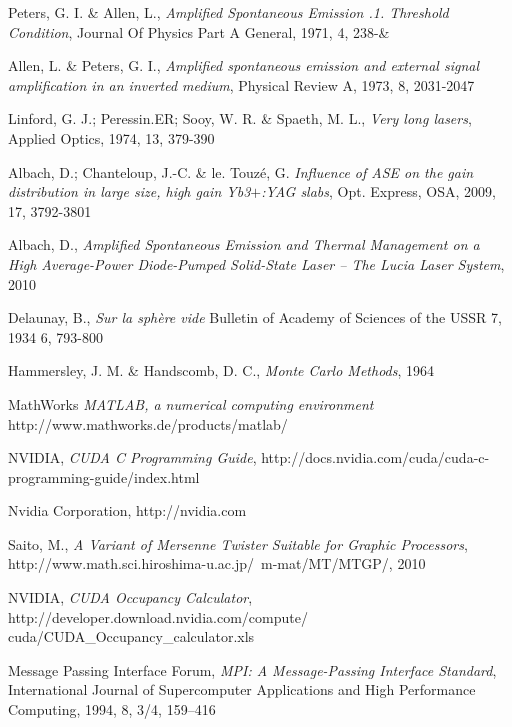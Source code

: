 \begin{thebibliography}{9}

    Peters, G. I. \& Allen, L., 
    \emph{Amplified Spontaneous Emission .1. Threshold Condition},
    Journal Of Physics Part A General, 
    1971, 
    4, 
    238-\&

    Allen, L. \& Peters, G. I.,
    \emph{Amplified spontaneous emission and external signal amplification in an inverted medium},
    Physical Review A, 
    1973, 
    8, 
    2031-2047

    Linford, G. J.; Peressin.ER; Sooy, W. R. \& Spaeth, M. L.,
    \emph{Very long lasers},
    Applied Optics, 
    1974, 
    13, 
    379-390

    Albach, D.; Chanteloup, J.-C. \& le. Touzé, G. 
    \emph{Influence of ASE on the gain distribution in large size, high gain Yb3$+$:YAG slabs},
    Opt. Express,
    OSA,
    2009, 
    17,
    3792-3801

    Albach, D.,
    \emph{Amplified Spontaneous Emission and Thermal Management on a High Average-Power Diode-Pumped Solid-State Laser \--- The Lucia Laser System},
    2010

    Delaunay, B.,
    \emph{Sur la sphère vide}
    Bulletin of Academy of Sciences of the USSR 7,
    1934
    6,
    793-800

    Hammersley, J. M. \& Handscomb, D. C.,
    \emph{Monte Carlo Methods},
    1964

    MathWorks
    \emph{MATLAB, a numerical computing environment}
    http://www.mathworks.de/products/matlab/

    NVIDIA,
    \emph{CUDA C Programming Guide},
    http://docs.nvidia.com/cuda/cuda-c-programming-guide/index.html

    Nvidia Corporation,
    http://nvidia.com

    Saito, M.,
    \emph{A Variant of Mersenne Twister Suitable for Graphic Processors},
    http://www.math.sci.hiroshima-u.ac.jp/~m-mat/MT/MTGP/,
    2010

    NVIDIA,
    \emph{CUDA Occupancy Calculator},
    http://developer.download.nvidia.com/compute/ cuda/CUDA\_Occupancy\_calculator.xls

    Message Passing Interface Forum,
    \emph{MPI: A Message-Passing Interface Standard}, 
    International Journal of Supercomputer Applications and High Performance Computing,
    1994,
    8, 3/4, 159–416


\end{thebibliography}
